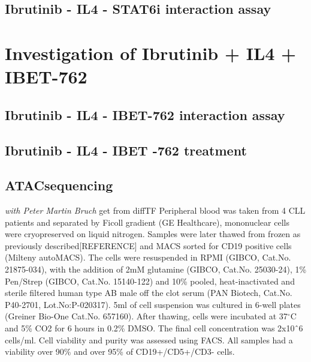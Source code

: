\documentclass[11pt, a4paper, twosided]{book}
\begin{document}
\hypertarget{ibrutinib---il4---stat6i-interaction-assay}{%
\subsection{Ibrutinib - IL4 - STAT6i interaction assay}\label{ibrutinib---il4---stat6i-interaction-assay}}

\hypertarget{investigation-of-ibrutinib-il4-ibet-762}{%
\section{Investigation of Ibrutinib + IL4 + IBET-762}\label{investigation-of-ibrutinib-il4-ibet-762}}

\hypertarget{ibrutinib---il4---ibet-762-interaction-assay}{%
\subsection{Ibrutinib - IL4 - IBET-762 interaction assay}\label{ibrutinib---il4---ibet-762-interaction-assay}}

\hypertarget{ibrutinib---il4---ibet--762-treatment}{%
\subsection{Ibrutinib - IL4 - IBET -762 treatment}\label{ibrutinib---il4---ibet--762-treatment}}

\hypertarget{atacsequencing}{%
\subsection{ATACsequencing}\label{atacsequencing}}

\emph{with Peter Martin Bruch} get from diffTF
Peripheral blood was taken from 4 CLL patients and separated by Ficoll gradient (GE Healthcare), mononuclear cells were cryopreserved on liquid nitrogen. Samples were later thawed from frozen as previously described{[}REFERENCE{]} and MACS sorted for CD19 positive cells (Milteny autoMACS). The cells were resuspended in RPMI (GIBCO, Cat.No. 21875-034), with the addition of 2mM glutamine (GIBCO, Cat.No. 25030-24), 1\% Pen/Strep (GIBCO, Cat.No. 15140-122) and 10\% pooled, heat-inactivated and sterile filtered human type AB male off the clot serum (PAN Biotech, Cat.No. P40-2701, Lot.No:P-020317). 5ml of cell suspension was cultured in 6-well plates (Greiner Bio-One Cat.No. 657160). After thawing, cells were incubated at 37\(^\circ\)C and 5\% CO2 for 6 hours in 0.2\% DMSO. The final cell concentration was 2x10ˆ6 cells/ml. Cell viability and purity was assessed using FACS. All samples had a viability over 90\% and over 95\% of CD19+/CD5+/CD3- cells.
\end{document}
